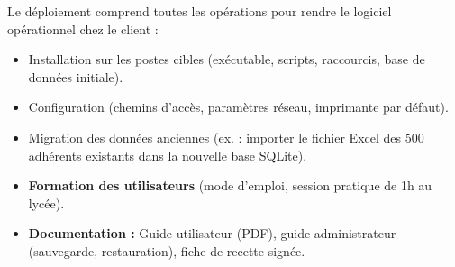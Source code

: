 \documentclass[11pt]{article}
\newcommand{\cle}[1]{{\popxbold\color{popdark}#1}}
\begin{document}
\begin{definition}[Déploiement]
Le \cle{déploiement} comprend toutes les opérations pour rendre le logiciel opérationnel chez le client :
\begin{itemize}
    \item Installation sur les postes cibles (exécutable, scripts, raccourcis, base de données initiale).
    \item Configuration (chemins d'accès, paramètres réseau, imprimante par défaut).
    \item Migration des données anciennes (ex. : importer le fichier Excel des 500 adhérents existants dans la nouvelle base SQLite).
    \item \textbf{Formation des utilisateurs} (mode d'emploi, session pratique de 1h au lycée).
    \item \textbf{Documentation :} Guide utilisateur (PDF), guide administrateur (sauvegarde, restauration), fiche de recette signée.
\end{itemize}
\end{definition}
\end{document}
